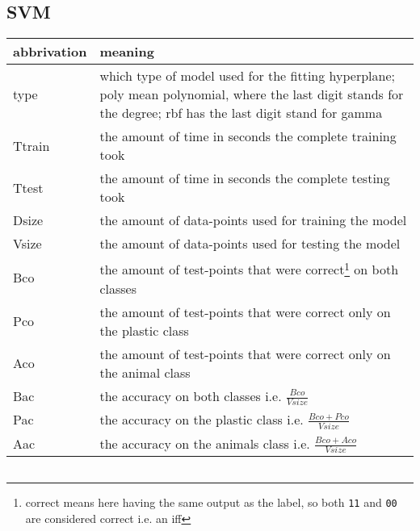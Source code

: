 \begin{appendix}
\subsection{SVM}
\ifx\showapp\undefined
\begin{tabular}{ p{ } | p{ } }
abbrivation & meaning \\ \hline
type & which type of model used for the fitting hyperplane; poly mean polynomial, where the last digit stands for the degree; rbf has the last digit stand for gamma \\
Ttrain & the amount of time in seconds the complete training took \\
Ttest & the amount of time in seconds the complete testing took \\
Dsize & the amount of data-points used for training the model \\
Vsize & the amount of data-points used for testing the model \\
Bco & the amount of test-points that were correct\footnote{correct means here having the same output as the label, so both \texttt{11} and \texttt{00} are considered correct i.e. an iff} on both classes \\
Pco & the amount of test-points that were correct only on the plastic class \\
Aco & the amount of test-points that were correct only on the animal class \\
Bac & the accuracy on both classes i.e. $\frac{Bco}{Vsize}$ \\
Pac & the accuracy on the plastic class i.e. $\frac{Bco+Pco}{Vsize}$ \\
Aac & the accuracy on the animals class i.e. $\frac{Bco+Aco}{Vsize}$
\end{tabular}
{\small
\begin{longtable}{r|r|r|r|r|r|r|r|r|r|r|r}

\end{longtable}
}
\fi
\end{appendix}
